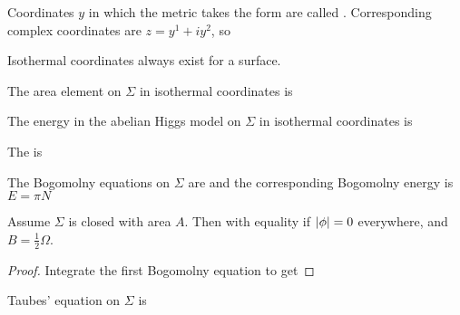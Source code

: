 \documentclass{article}
\begin{document}
\begin{definition}
Coordinates $y$ in which the metric takes the form 
are called . Corresponding complex coordinates are $z = y^1 + iy^2$, so 
\end{definition}

\begin{prop}
Isothermal coordinates always exist for a surface. 
\end{prop}

\begin{prop}
The area element on $\Sigma$ in isothermal coordinates is 
\end{prop}

\begin{prop}
The energy in the abelian Higgs model on $\Sigma$ in isothermal coordinates is  
\end{prop}

\begin{definition}
The  is 
\end{definition}

\begin{prop}
The Bogomolny equations on $\Sigma$ are 
and the corresponding Bogomolny energy is $E=\pi N$
\end{prop}
\begin{corollary}
Assume $\Sigma$ is closed with area $A$. Then 
with equality if $\left\lvert \phi \right\rvert = 0$ everywhere, and $B = \frac{1}{2}\Omega$. 
\end{corollary}
\begin{proof}
Integrate the first Bogomolny equation to get 
\end{proof}

\begin{prop}
Taubes' equation on $\Sigma$ is 
\end{prop}
\end{document}
